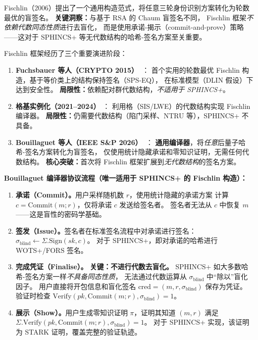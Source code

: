 \documentclass[11pt,a4paper]{ctexart}
\begin{document}
Fischlin（2006）提出了一个通用构造范式，将任意三轮身份识别方案转化为轮数最优的盲签名。
\textbf{关键洞察：}与基于 RSA 的 Chaum 盲签名不同，
Fischlin 框架\emph{不依赖代数同态性质}进行去盲化，
而是使用承诺-揭示（commit-and-prove）策略——这对于 SPHINCS+
等无代数结构的哈希-签名方案至关重要。

Fischlin 框架经历了三个重要演进阶段：

\begin{enumerate}[label=\textbf{\arabic*.},leftmargin=*]
\item \textbf{Fuchsbauer 等人（CRYPTO 2015）~\cite{Fuchsbauer2015Practical}}：
  首个实用的轮数最优 Fischlin 构造，基于等价类上的结构保持签名（SPS-EQ），
  在标准模型（DLIN 假设）下达到安全性。
  \textbf{局限性：}依赖配对群代数结构，\emph{不适用于 SPHINCS+}。
\item \textbf{格基实例化（2021--2024）
  \cite{delPino2022Framework,Beullens2023LatticeBlind,Agrawal2022Practical,Katsumata2021,Kastner2024PairingFree}}：
  利用格（SIS/LWE）的代数结构实现 Fischlin 编译器。
  \textbf{局限性：}仍需要代数结构（陷门采样、NTRU 等），SPHINCS+ 不具备。
\item \textbf{Bouillaguet 等人（IEEE S\&P 2026）~\cite{Bouillaguet2026BlindingPH}}：
  \textbf{通用编译器}，将\emph{任意}后量子哈希-签名方案转化为盲签名，
  仅使用统计隐藏承诺和零知识证明，无需任何代数结构。
  \textbf{核心突破：}首次将 Fischlin 框架扩展到\emph{无代数结构}的签名方案。
\end{enumerate}

\noindent\textbf{Bouillaguet 编译器协议流程（唯一适用于 SPHINCS+ 的 Fischlin 构造）：}

\begin{enumerate}[label=\textbf{阶段 \arabic*.},leftmargin=*]
\item \textbf{承诺（Commit）。}用户采样随机数 $r$，使用统计隐藏的承诺方案
  计算 $c = \mathrm{Commit}(m; r)$，仅将承诺 $c$ 发送给签名者。
  签名者无法从 $c$ 中恢复 $m$——这是盲性的密码学基础。
\item \textbf{签发（Issue）。}签名者在标准签名流程中对承诺进行签名：
  $\sigma_{\mathrm{blind}} \leftarrow \Sigma.\mathrm{Sign}(sk, c)$。
  对于 SPHINCS+，即对承诺的哈希进行 WOTS+/FORS 签名。
\item \textbf{完成凭证（Finalise）。}
  \textbf{关键：不进行代数去盲化。}
  SPHINCS+ 如大多数哈希-签名方案一样\emph{不具备同态性质}，
  无法通过代数运算从 $\sigma_{\mathrm{blind}}$ 中``除以''盲化因子。
  用户直接将开包信息和盲化签名 $\mathrm{cred} = (m, r, \sigma_{\mathrm{blind}})$ 保存为凭证。
  验证时检查 $\mathrm{Verify}(pk, \mathrm{Commit}(m; r), \sigma_{\mathrm{blind}}) = 1$。
\item \textbf{展示（Show）。}用户生成零知识证明 $\pi$，证明其知道 $(m, r)$
  满足 $\Sigma.\mathrm{Verify}(pk, \mathrm{Commit}(m; r), \sigma_{\mathrm{blind}}) = 1$。
  对于 SPHINCS+ 实现，该证明为 STARK 证明，覆盖完整的验证轨迹。
\end{enumerate}
\end{document}
